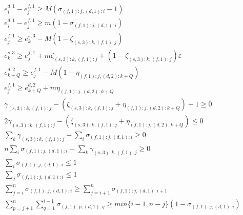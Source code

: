 \documentclass[]{interact}
\theoremstyle{plain}%
\theoremstyle{definition}
\theoremstyle{remark}
\begin{document}
\begin{eqnarray}
e^{d,1}_i-e^{f,1}_j\ge M(\sigma_{(f,1):j,(d,1):i}-1)\label{MergeErg:13.1}\\
e^{d,1}_i-e^{f,1}_j\ge m(1 - \sigma_{(f,1):j,(d,1):i})\\
e^{f,1}_{j} \ge e^{s,3}_{k} - M(1-\zeta_{(s,3):k,(f,1):j})\\ 
e^{s,3}_{k} \ge e^{f,1}_{j} + m\zeta_{(s,3):k,(f,1):j} +(1-\zeta_{(s,3):k,(f,1):j})\varepsilon\\ 
e^{d,2}_{k+Q} \ge e^{f,1}_{j} - M(1-\eta_{(f,1):j,(d,2):k+Q})\\
e^{f,1}_{j} \ge e^{d,2}_{k+Q} + m\eta_{(f,1):j,(d,2):k+Q}\\
\gamma_{(s,3):k,(f,1):j} - (\zeta_{(s,3):k,(f,1):j} + \eta_{(f,1):j,(d,2):k+Q})+1\ge 0\\
2\gamma_{(s,3):k,(f,1):j}-(\zeta_{(s,3):k,(f,1):j} + \eta_{(f,1):j,(d,2):k+Q})\le 0\\
\sum_k\gamma_{(s,3):k,(f,1):j}-\sum_i \sigma_{(f,1):j,(d,1):i} \ge 0\\
n\sum_{i}\sigma_{(f,1):j,(d,1):i} - \sum_k\gamma_{(s,3):k,(f,1):j}\ge 0\\
\sum_{i}\sigma_{(f,1):j,(d,1):i}\le 1\\
\sum_{j}\sigma_{(f,1):j,(d,1):i}\le 1\\
\sum_{j=i}^{n}\sigma_{(f,1):j,(d,1):i}\ge \sum_{j=i+1}^{n}\sigma_{(f,1):j,(d,1):i+1}\\
\sum_{p=j+1}^n\sum_{q=1}^{i-1} \sigma_{(f,1):p,(d,1):q} \ge min\{i-1,n-j\}(1-\sigma_{(f,1):j,(d,1):i})\label{MergeErg:13.2}
\end{eqnarray}
\end{document}
